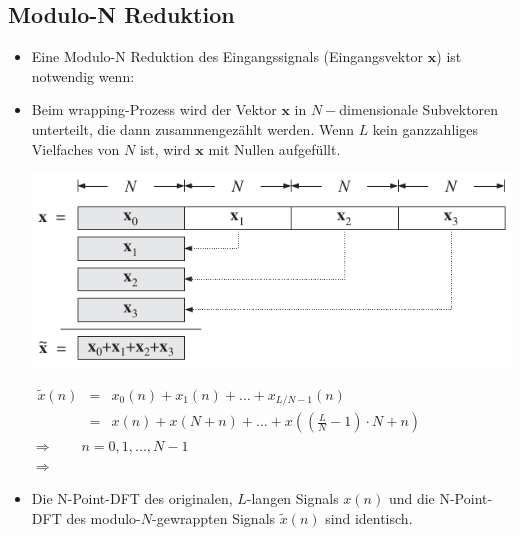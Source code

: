	\subsection{Modulo-N Reduktion}\label{modNred}
		\begin{itemize}
		 \item Eine Modulo-N Reduktion des Eingangssignals (Eingangsvektor $\bm{x}$) ist notwendig wenn:\\[0.2cm]
		 \item Beim wrapping-Prozess wird der Vektor $\bm{x}$ in $N-$dimensionale Subvektoren unterteilt, die dann zusammengezählt werden. Wenn $L$ kein ganzzahliges Vielfaches von $N$ ist, wird $\bm{x}$ mit Nullen aufgefüllt.\\[0.2cm]
		 \begin{minipage}{0.47\textwidth}
			\includegraphics[width = \textwidth]{pic/modNred.pdf}
		 \end{minipage}
		 \begin{minipage}{0.53\textwidth}
			$\begin{array}{lcl}\widetilde x(n) & = & x_0(n) + x_1(n) + \hdots + x_{L/N-1}(n)\\[0.2cm] &=& x(n) + x(N+n) + \hdots + x((\frac{L}{N}-1)\cdot N + n)\end{array}$\\[0.2cm]
			$\Rightarrow\quad$$\quad n = 0,1,...,N-1$\\[0.2cm]
			$\Rightarrow\quad$
		 \end{minipage}
\newpage
		 \item Die N-Point-DFT des originalen, $L$-langen Signals $x(n)$ und die N-Point-DFT des modulo-$N$-gewrappten Signals $\widetilde x(n)$ sind identisch.\\[-0.4cm]
		 \begin{minipage}{0.35\textwidth}

\end{minipage}
\end{itemize}
